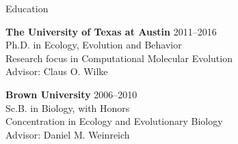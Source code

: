 \documentclass{resume} %
\begin{document}
\vspace*{0.35cm}
\begin{rSection}{Education}
\vspace*{0.25cm}

{\bf The University of Texas at Austin} \hfill {2011--2016} \\
Ph.D. in Ecology, Evolution and Behavior \\
Research focus in Computational Molecular Evolution \\
Advisor: Claus O. Wilke \\

\smallskip

{\bf Brown University} \hfill {2006--2010} \\
Sc.B. in Biology, with Honors \\
Concentration in Ecology and Evolutionary Biology \\
Advisor: Daniel M. Weinreich \\

\end{rSection}

\end{document}
